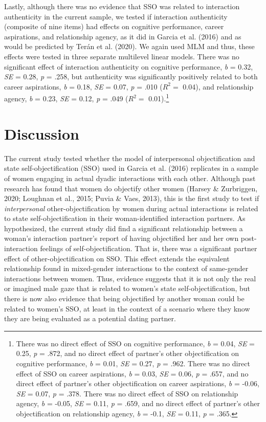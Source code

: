 \documentclass[man]{apa6}
\let\rmarkdownfootnote\footnote%
\def\footnote{\protect\rmarkdownfootnote}
\begin{document}
Lastly, although there was no evidence that SSO was related to
interaction authenticity in the current sample, we tested if interaction
authenticity (composite of nine items) had effects on cognitive
performance, career aspirations, and relationship agency, as it did in
Garcia et al. (2016) and as would be predicted by Terán et al. (2020).
We again used MLM and thus, these effects were tested in three separate
multilevel linear models. There was no significant effect of interaction
authenticity on cognitive performance, \emph{b} = 0.32, \emph{SE} =
0.28, \emph{p} = .258, but authenticity was significantly positively
related to both career aspirations, \emph{b} = 0.18, \emph{SE} = 0.07,
\emph{p} = .010 (\(R^2 =\) 0.04), and relationship agency, \emph{b} =
0.23, \emph{SE} = 0.12, \emph{p} = .049 (\(R^2 =\) 0.01).\footnote{There
  was no direct effect of SSO on cognitive performance, \emph{b} = 0.04,
  \emph{SE} = 0.25, \emph{p} = .872, and no direct effect of partner's
  other objectification on cognitive performance, \emph{b} = 0.01,
  \emph{SE} = 0.27, \emph{p} = .962. There was no direct effect of SSO
  on career aspirations, \emph{b} = 0.03, \emph{SE} = 0.06, \emph{p} =
  .657, and no direct effect of partner's other objectification on
  career aspirations, \emph{b} = -0.06, \emph{SE} = 0.07, \emph{p} =
  .378. There was no direct effect of SSO on relationship agency,
  \emph{b} = -0.05, \emph{SE} = 0.11, \emph{p} = .659, and no direct
  effect of partner's other objectification on relationship agency,
  \emph{b} = -0.1, \emph{SE} = 0.11, \emph{p} = .365.}

\section{Discussion}\label{discussion}

The current study tested whether the model of interpersonal
objectification and state self-objectification (SSO) used in Garcia et
al. (2016) replicates in a sample of women engaging in actual dyadic
interactions with each other. Although past research has found that
women do objectify other women (Harsey \& Zurbriggen, 2020; Loughnan et
al., 2015; Puvia \& Vaes, 2013), this is the first study to test if
\emph{interpersonal} other-objectification by women during actual
interactions is related to state self-objectification in their
woman-identified interaction partners. As hypothesized, the current
study did find a significant relationship between a woman's interaction
partner's report of having objectified her and her own post-interaction
feelings of self-objectification. That is, there was a significant
partner effect of other-objectification on SSO. This effect extends the
equivalent relationship found in mixed-gender interactions to the
context of same-gender interactions between women. Thus, evidence
suggests that it is not only the real or imagined male gaze that is
related to women's state self-objectification, but there is now also
evidence that being objectified by another woman could be related to
women's SSO, at least in the context of a scenario where they know they
are being evaluated as a potential dating partner.
\end{document}
